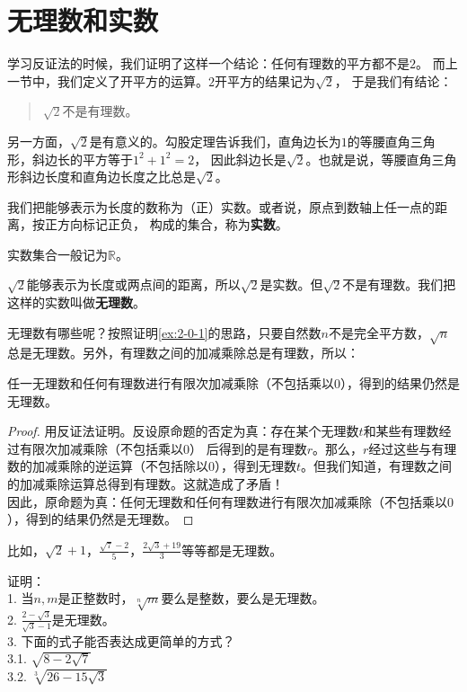 \documentclass[12pt,UTF8,fontset=none]{ctexbook}
\begin{document}
\section{无理数和实数}
学习反证法的时候，我们证明了这样一个结论：任何有理数的平方都不是$2$。
而上一节中，我们定义了开平方的运算。$2$开平方的结果记为$\sqrt{2}$，
于是我们有结论：
\begin{quotation}
    $\sqrt{2}$不是有理数。
\end{quotation}

另一方面，$\sqrt{2}$是有意义的。勾股定理告诉我们，直角边长为$1$的等腰直角三角形，斜边长的平方等于$1^2+1^2=2$，
因此斜边长是$\sqrt{2}$。也就是说，等腰直角三角形斜边长度和直角边长度之比总是$\sqrt{2}$。

我们把能够表示为长度的数称为（正）实数。或者说，原点到数轴上任一点的距离，按正方向标记正负，
构成的集合，称为\textbf{实数}。

实数集合一般记为$\mathbb{R}$。

$\sqrt{2}$能够表示为长度或两点间的距离，所以$\sqrt{2}$是实数。但$\sqrt{2}$不是有理数。我们把这样的实数叫做\textbf{无理数}。

无理数有哪些呢？按照证明\ref{ex:2-0-1}的思路，只要自然数$n$不是完全平方数，$\sqrt{n}$总是无理数。另外，有理数之间的加减乘除总是有理数，所以：
\begin{tm}\label{tm:3-1-0}
    任一无理数和任何有理数进行有限次加减乘除（不包括乘以$0$），得到的结果仍然是无理数。
\end{tm}
\begin{proof}
    用反证法证明。反设原命题的否定为真：存在某个无理数$t$和某些有理数经过有限次加减乘除（不包括乘以$0$）
    后得到的是有理数$r$。那么，$r$经过这些与有理数的加减乘除的逆运算（不包括除以$0$），得到无理数$t$。但我们知道，有理数之间的加减乘除运算总得到有理数。这就造成了矛盾！\\
    因此，原命题为真：任何无理数和任何有理数进行有限次加减乘除（不包括乘以$0$），得到的结果仍然是无理数。
\end{proof}

比如，$\sqrt{2}+1$，$\displaystyle\frac{\sqrt{7} - 2}{5}$，$\displaystyle\frac{2\sqrt{3} + 19}{3}$等等都是无理数。

\begin{xt}\label{xt:3-1-0}
    证明：\\
    1. 当$n,m$是正整数时，$\sqrt[n]{m}$要么是整数，要么是无理数。\\
    2. $\displaystyle\frac{2 - \sqrt{3}}{\sqrt{3} - 1}$是无理数。\\
    3. 下面的式子能否表达成更简单的方式？\\
    3.1. $\sqrt{8 - 2\sqrt{7}}$\\
    3.2. $\sqrt[3]{26 - 15\sqrt{3}}$
\end{xt}
\end{document}
